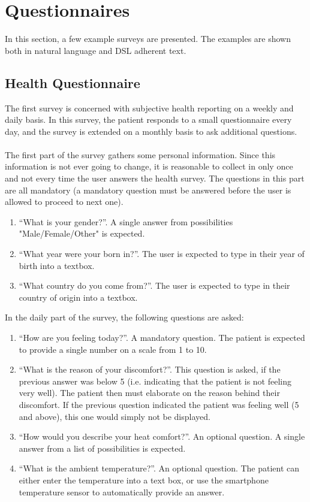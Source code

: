 \section{Questionnaires}
\label{sec:questionnaires}
In this section, a few example surveys are presented. The examples are shown both in natural language and DSL adherent text.

\subsection{Health Questionnaire}
\label{subsec:healthquestionnaire}
The first survey is concerned with subjective health reporting on a weekly and daily basis. In this survey, the patient responds to a small questionnaire every day, and the survey is extended on a monthly basis to ask additional questions.\\\\
The first part of the survey gathers some personal information. Since this information is not ever going to change, it is reasonable to collect in only once and not every time the user answers the health survey. The questions in this part are all mandatory (a mandatory question must be answered before the user is allowed to proceed to next one).

\begin{enumerate}
\item ``What is your gender?''. A single answer from possibilities "Male/Female/Other" is expected.
\item ``What year were your born in?''. The user is expected to type in their year of birth into a textbox.
\item ``What country do you come from?''. The user is expected to type in their country of origin into a textbox.
\end{enumerate}

In the daily part of the survey, the following questions are asked: 

\begin{enumerate}
\item ``How are you feeling today?''. A mandatory question. The patient is expected to provide a single number on a scale from 1 to 10.
\item ``What is the reason of your discomfort?''. This question is asked, if the previous answer was below 5 (i.e. indicating that the patient is not feeling very well). The patient then must elaborate on the reason behind their discomfort. If the previous question indicated the patient was feeling well (5 and above), this one would simply not be displayed.
\item ``How would you describe your heat comfort?''. An optional question. A single answer from a list of possibilities is expected.
\item ``What is the ambient temperature?''. An optional question. The patient can either enter the temperature into a text box, or use the smartphone temperature sensor to automatically provide an answer.
\end{enumerate}

